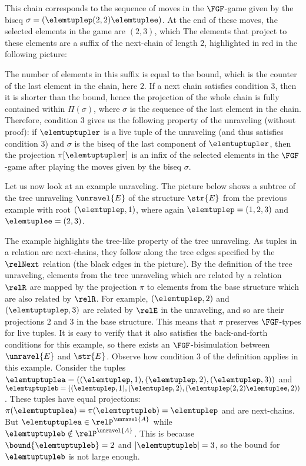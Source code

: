 This chain corresponds to the sequence of moves in the $\FGF$-game given by the biseq $\sigma = (\elemtuplep(2,2)\elemtuplee)$.
At the end of these moves, the selected elements in the game are $(2,3)$, which
The elements that project to these elements are a suffix of the next-chain of length 2, highlighted in red in the following picture:
\begin{figure}[H]
  \centering
  
\end{figure}
The number of elements in this suffix is equal to the bound, which is the counter of the last element in the chain, here $2$.
If a next chain satisfies condition 3, then it is shorter than the bound, hence the projection of the whole chain is fully contained within $\Pi(\sigma)$, where $\sigma$ is the sequence of the last element in the chain.
Therefore, condition 3 gives us the following property of the unraveling (without proof): if $\elemtuptupler$ is a live tuple of the unraveling (and thus satisfies condition 3) and $\sigma$ is the biseq of the last component of $\elemtuptupler$, then the projection $\pi[\elemtuptupler]$ is an infix of the selected elements in the $\FGF$-game after playing the moves given by the biseq $\sigma$.

Let us now look at an example unraveling.
The picture below shows a subtree of the tree unraveling $\unravel{E}$ of the structure $\str{E}$ from the previous example with root $(\elemtuplep, 1)$, where again $\elemtuplep = (1,2,3)$ and $\elemtuplee = (2,3)$.
\begin{figure}[H]
  \centering
  
\end{figure}

\noindent
The example highlights the tree-like property of the tree unraveling.
As tuples in a relation are next-chains, they follow along the tree edges specified by the $\relNext$ relation (the black edges in the picture).
By the definition of the tree unraveling, elements from the tree unraveling which are related by a relation $\relR$ are mapped by the projection $\pi$ to elements from the base structure which are also related by $\relR$.
For example, $(\elemtuplep, 2)$ and $(\elemtuptuplep, 3)$ are related by $\relE$ in the unraveling, and so are their projections $2$ and $3$ in the base structure.
This means that $\pi$ preserves $\FGF$-types for live tuples.
It is easy to verify that it also satisfies the back-and-forth conditions for this example, so there exists an $\FGF$-bisimulation between $\unravel{E}$ and $\str{E}$.
Observe how condition 3 of the definition applies in this example.
Consider the tuples $\elemtuptuplea = ((\elemtuplep, 1), (\elemtuplep, 2), (\elemtuplep, 3))$ and $\elemtuptupleb = ((\elemtuplep, 1), (\elemtuplep, 2), (\elemtuplep(2,2)\elemtuplee, 2))$.
These tuples have equal projections: $\pi(\elemtuptuplea) = \pi(\elemtuptupleb) = \elemtuplep$ and are next-chains.
But $\elemtuptuplea \in \relP^{\unravel{A}}$ while $\elemtuptupleb \notin \relP^{\unravel{A}}$.
This is because $\bound{\elemtuptupleb} = 2$ and $|\elemtuptupleb| = 3$, so the bound for $\elemtuptupleb$ is not large enough.

